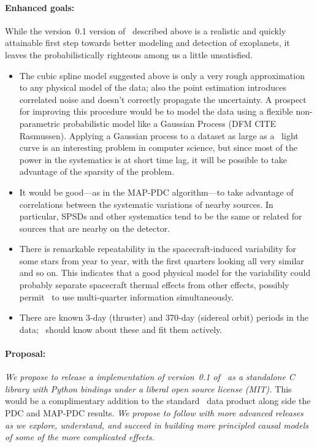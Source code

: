 \documentclass[letterpaper,12pt,preprint]{hack_aastex}
\newcommand{\Untrendy}{\package{Untrendy}}
\begin{document}
\paragraph{Enhanced goals:}
While the version~0.1 version of \Untrendy\ described above is a realistic and
quickly attainable first step towards better modeling and detection of
exoplanets, it leaves the probabilistically
righteous among us a little unsatisfied.
\begin{itemize}
\item
The cubic spline model suggested above is only a very rough approximation to
any physical model of the data; also the point estimation introduces
correlated noise and doesn't
correctly propagate the uncertainty.
A prospect for improving this procedure would be to model the data
using a flexible non-parametric probabilistic model like a Gaussian Process
 (DFM CITE Rasmussen).
Applying a Gaussian process to a dataset as large as a \Kepler\ light curve is
an interesting problem in computer science, but since most of the power in the
systematics is at short time lag, it will be possible to take advantage of
the sparsity of the problem.
\item
It would be good---as in the MAP-PDC
algorithm---to take advantage of correlations between the systematic
variations of nearby sources.
In particular, SPSDs and other
systematics tend to be the same or related for sources that are nearby
on the detector.
\item
There is remarkable repeatability in the spacecraft-induced
variability for some stars from year to year, with the
first quarters looking all very similar and so on.
This indicates that a good physical model for the variability could probably
separate spacecraft thermal effects from other effects, possibly
permit \Untrendy\ to use multi-quarter information simultaneously.
\item
There are known 3-day (thruster) and 370-day (sidereal orbit) periods
in the data; \Untrendy\ should know about these and fit them actively.
\end{itemize}

\paragraph{Proposal:}
\emph{We propose to release a implementation of version~0.1 of \Untrendy\ as a standalone C
library with Python bindings under a liberal open source license (MIT).}
This would be a complimentary addition to the standard \Kepler\ data
product along side the PDC and MAP-PDC results.
\emph{We propose to follow with more advanced releases as we explore,
understand, and succeed in building more principled causal models of some
of the more complicated effects.}
\end{document}
